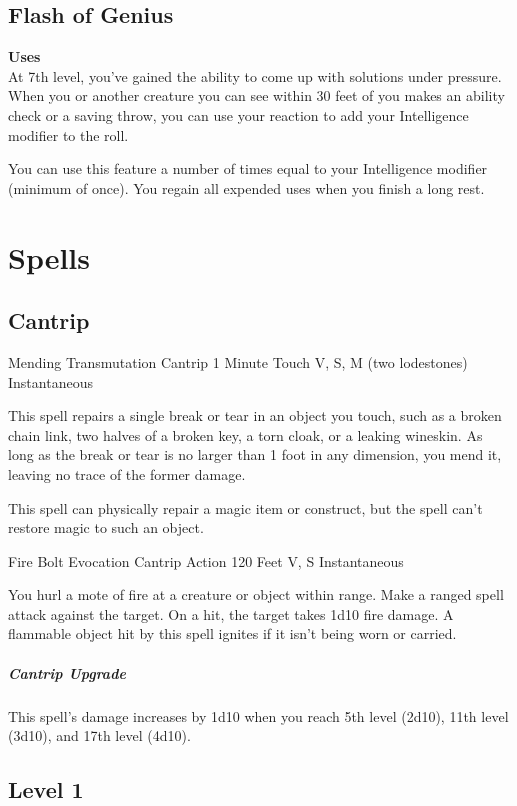 \documentclass[letterpaper,openany,oneside,twocolumn]{book}
\begin{document}
\subsection*{Flash of Genius}
\textbf{ Uses}\\
At 7th level, you've gained the ability to come up with solutions under pressure. When you or another creature you can see within 30 feet of you makes an ability check or a saving throw, you can use your reaction to add your Intelligence modifier to the roll.

You can use this feature a number of times equal to your Intelligence modifier (minimum of once). You regain all expended uses when you finish a long rest.

\section*{Spells}
\subsection*{Cantrip}

\DndSpellHeader
  {Mending}
  {Transmutation Cantrip}
  {1 Minute}
  {Touch}
  {V, S, M (two lodestones)}
  {Instantaneous}

This spell repairs a single break or tear in an object you touch, such as a broken chain link, two halves of a broken key, a torn cloak, or a leaking wineskin. As long as the break or tear is no larger than 1 foot in any dimension, you mend it, leaving no trace of the former damage.

This spell can physically repair a magic item or construct, but the spell can't restore magic to such an object.

\DndSpellHeader
  {Fire Bolt}
  {Evocation Cantrip}
  {Action}
  {120 Feet}
  {V, S}
  {Instantaneous}

You hurl a mote of fire at a creature or object within range. Make a ranged spell attack against the target. On a hit, the target takes 1d10 fire damage. A flammable object hit by this spell ignites if it isn't being worn or carried.

\subparagraph*{Cantrip Upgrade} This spell's damage increases by 1d10 when you reach 5th level (2d10), 11th level (3d10), and 17th level (4d10).

\subsection*{Level 1}
\end{document}
